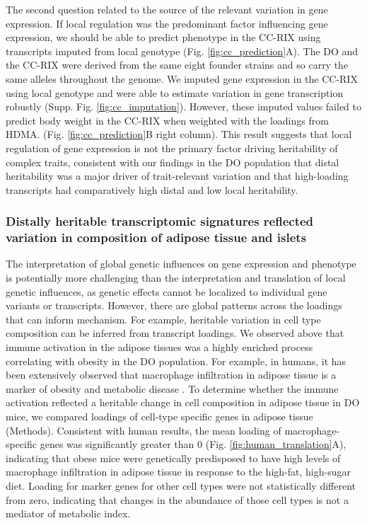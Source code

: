\documentclass[
]{article}
\begin{document}
The second question related to the source of the relevant variation in
gene expression. If local regulation was the predominant factor
influencing gene expression, we should be able to predict phenotype in
the CC-RIX using transcripts imputed from local genotype (Fig.
\ref{fig:cc_prediction}A). The DO and the CC-RIX were derived from the
same eight founder strains and so carry the same alleles throughout the
genome. We imputed gene expression in the CC-RIX using local genotype
and were able to estimate variation in gene transcription robustly
(Supp. Fig. \ref{fig:cc_imputation}). However, these imputed values
failed to predict body weight in the CC-RIX when weighted with the
loadings from HDMA. (Fig. \ref{fig:cc_prediction}B right column). This
result suggests that local regulation of gene expression is not the
primary factor driving heritability of complex traits, consistent with
our findings in the DO population that distal heritability was a major
driver of trait-relevant variation and that high-loading transcripts had
comparatively high distal and low local heritability.

\subsubsection{Distally heritable transcriptomic signatures reflected
variation in composition of adipose tissue and
islets}\label{distally-heritable-transcriptomic-signatures-reflected-variation-in-composition-of-adipose-tissue-and-islets}

The interpretation of global genetic influences on gene expression and
phenotype is potentially more challenging than the interpretation and
translation of local genetic influences, as genetic effects cannot be
localized to individual gene variants or transcripts. However, there are
global patterns across the loadings that can inform mechanism. For
example, heritable variation in cell type composition can be inferred
from transcript loadings. We observed above that immune activation in
the adipose tissues was a highly enriched process correlating with
obesity in the DO population. For example, in humans, it has been
extensively observed that macrophage infiltration in adipose tissue is a
marker of obesity and metabolic disease \cite{pmid24781408}. To
determine whether the immune activation reflected a heritable change in
cell composition in adipose tissue in DO mice, we compared loadings of
cell-type specific genes in adipose tissue (Methods). Consistent with
human results, the mean loading of macrophage-specific genes was
significantly greater than 0 (Fig. \ref{fig:human_translation}A),
indicating that obese mice were genetically predisposed to have high
levels of macrophage infiltration in adipose tissue in response to the
high-fat, high-sugar diet. Loading for marker genes for other cell types
were not statistically different from zero, indicating that changes in
the abundance of those cell types is not a mediator of metabolic index.
\end{document}
